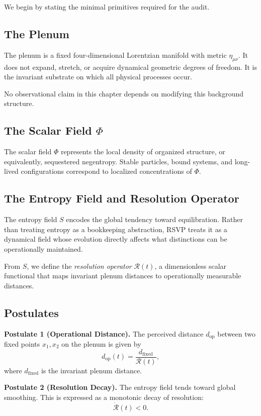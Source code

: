\documentclass[11pt]{book}
\begin{document}
We begin by stating the minimal primitives required for the audit.

\subsection{The Plenum}

The plenum is a fixed four-dimensional Lorentzian manifold with metric \(\eta_{\mu\nu}\). It does not expand, stretch, or acquire dynamical geometric degrees of freedom. It is the invariant substrate on which all physical processes occur.

No observational claim in this chapter depends on modifying this background structure.

\subsection{The Scalar Field \(\Phi\)}

The scalar field \(\Phi\) represents the local density of organized structure, or equivalently, sequestered negentropy. Stable particles, bound systems, and long-lived configurations correspond to localized concentrations of \(\Phi\).

\subsection{The Entropy Field and Resolution Operator}

The entropy field \(S\) encodes the global tendency toward equilibration. Rather than treating entropy as a bookkeeping abstraction, RSVP treats it as a dynamical field whose evolution directly affects what distinctions can be operationally maintained.

From \(S\), we define the \emph{resolution operator} \(\mathcal{R}(t)\), a dimensionless scalar functional that maps invariant plenum distances to operationally measurable distances.

\subsection{Postulates}

\textbf{Postulate 1 (Operational Distance).}
The perceived distance \(d_{\text{op}}\) between two fixed points \(x_1, x_2\) on the plenum is given by
\[
d_{\text{op}}(t) = \frac{d_{\text{fixed}}}{\mathcal{R}(t)} ,
\]
where \(d_{\text{fixed}}\) is the invariant plenum distance.

\textbf{Postulate 2 (Resolution Decay).}
The entropy field tends toward global smoothing. This is expressed as a monotonic decay of resolution:
\[
\dot{\mathcal{R}}(t) < 0 .
\]
\end{document}
